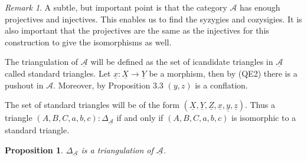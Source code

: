 \documentclass[11pt]{article}
\newtheorem{prop}[theorem]{Proposition}
\theoremstyle{definition}
\theoremstyle{remark}
\newtheorem*{remark}{Remark}
\begin{document}
            \begin{remark}
                A subtle, but important point is that the category $\mathcal{A}$ has enough projectives and injectives. This enables us to find the syzygies and cozysigies. It is also important that the projectives are the same as the injectives for this construction to give the isomorphisms as well.
            \end{remark}

            The triangulation of $\underline{\mathcal{A}}$ will be defined as the set of icandidate triangles in $\underline{\mathcal{A}}$ called standard triangles. Let $\underline{x}:\underline{X}\rightarrow\underline{Y}$ be a morphism, then by (QE2) there is a pushout in $\mathcal{A}$. Moreover, by Proposition 3.3 $(y,z)$ is a conflation.

            \begin{minipage}[c]{0.6\textwidth}
                \begin{center}
                \end{center}
            \end{minipage}
            \begin{minipage}[c]{0.4\textwidth}
                The set of standard triangles will be of the form $(\underline{X},\underline{Y},\underline{Z},\underline{x},\underline{y},\underline{z})$. Thus a triangle $(A,B,C,a,b,c):\Delta_{\underline{\mathcal{A}}}$ if and only if $(A,B,C,a,b,c)$ is isomorphic to a standard triangle.
            \end{minipage}

            \begin{prop}
                $\Delta_{\underline{\mathcal{A}}}$ is a triangulation of $\underline{\mathcal{A}}$.
            \end{prop}
\end{document}
